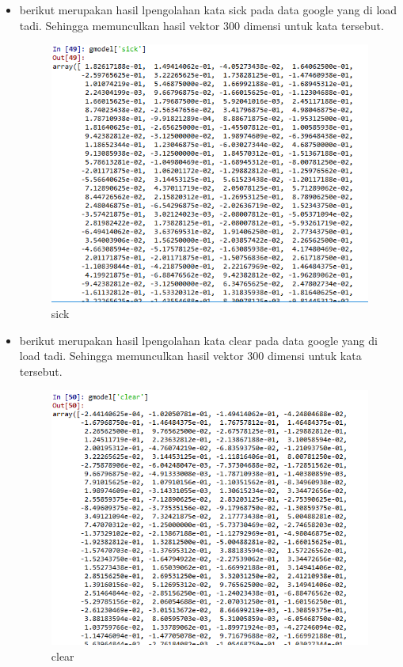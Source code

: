 \begin{enumerate}
\begin{itemize}
				\item berikut merupakan hasil lpengolahan kata sick pada data google yang di load tadi. Sehingga memunculkan hasil vektor 300 dimensi untuk kata tersebut.
	  			\begin{figure}[H]
					\centering
					\includegraphics[scale=0.4]{figures/1174057/chapter5/sick.PNG}
					\caption{sick}
					\label{sick}
				\end{figure}

				\item berikut merupakan hasil lpengolahan kata clear pada data google yang di load tadi. Sehingga memunculkan hasil vektor 300 dimensi untuk kata tersebut.
	  			\begin{figure}[H]
					\centering
					\includegraphics[scale=0.4]{figures/1174057/chapter5/clear.PNG}
					\caption{clear}
					\label{clear}
				\end{figure}


\end{itemize}
\end{enumerate}
